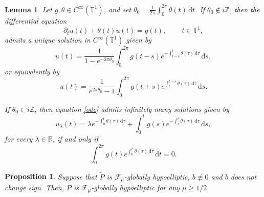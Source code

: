 \documentclass[10pt,a4paper]{amsart}
\newtheorem{prop}{Proposition}
\newtheorem{lemma}{Lemma}
\newcommand{\T}{\mathbb{T}}
\begin{document}
\begin{lemma}\label{lemmaodesol}
	Let $g,\theta \in C^{\infty}(\T^1)$, and set $\theta_0 = \frac{1}{2\pi}\int_0^{2\pi}\theta(t)\,\mathrm{d}t$. If $\theta_0\not\in i\mathbb{Z}$, then the differential equation
	\begin{equation}\label{ode}
		\partial_t u(t)+\theta(t)u(t)=g(t),\,\qquad t\in\T^1,
	\end{equation}
	admits a unique solution in $C^\infty(\T^1)$ given by
	\begin{equation}\label{sol-}
		u(t) = \frac{1}{1-e^{-2\pi\theta_0}}\int_0^{2\pi}g(t-s)e^{-\int_{t-s}^t\theta(\tau)\,\mathrm{d}\tau}\,\mathrm{d}s,
	\end{equation} 
	or equivalently by
	\begin{equation}\label{sol+}
		u(t) = \frac{1}{e^{2\pi\theta_0}-1}\int_0^{2\pi}g(t+s)e^{\int_{t}^{t+s}\theta(\tau)\,\mathrm{d}\tau}\,\mathrm{d}s.
	\end{equation}
	
	If $\theta_0\in i\mathbb{Z}$, then equation \eqref{ode} admits infinitely many solutions given by
	\begin{equation*}
		u_\lambda(t) = \lambda e^{-\int_0^t\theta(\tau)\,\mathrm{d}\tau}+\int_0^t g(s)e^{-\int_s^t\theta(\tau)\,\mathrm{d}\tau}\,\mathrm{d}s,
	\end{equation*}
	for every $\lambda\in\mathbb{R}$, if and only if
	$$ \int_0^{2\pi}g(t)e^{\int_0^t\theta(\tau)\,\mathrm{d}\tau}\,\mathrm{d}t=0.$$
\end{lemma}

\begin{prop}
    Suppose that $\tilde P$ is $\mathscr{F}_{\mu}$-globally hypoelliptic, $b\not\equiv 0$ and $b$ does not change sign. Then, $P$ is $\mathscr{F}_{\mu}$-globally hypoelliptic for any $\mu\geq 1/2$.
\end{prop}
\end{document}
